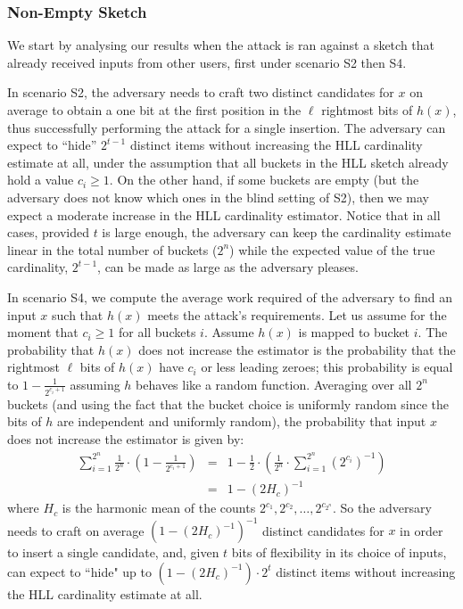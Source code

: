 \documentclass[11pt]{article}
\begin{document}
\subsubsection{Non-Empty Sketch}\label{sec:nonempty}

We start by analysing our results when the attack is ran against a sketch that already received inputs from other users, first under scenario S2 then S4. 

In scenario S2, the adversary needs to craft two distinct candidates for $x$ on average to obtain a one bit at the first position in the $\ell$ rightmost bits of $h(x)$, thus successfully performing the attack for a single insertion. The adversary can expect to ``hide''  $2^{t-1}$ distinct items without increasing the HLL cardinality estimate at all, under the assumption that all buckets in the HLL sketch already hold a value $c_i \ge 1$. On the other hand, if some buckets are empty (but the adversary does not know which ones in the blind setting of S2), then we may expect a moderate increase in the HLL cardinality estimator. Notice that in all cases, provided $t$ is large enough, the adversary can keep the cardinality estimate linear in the total number of buckets ($2^n$) while the expected value of the true cardinality, $2^{t-1}$, can be made as large as the adversary pleases.

In scenario S4, we compute the average work required of the adversary to find an input $x$ such that $h(x)$ meets the attack's requirements. Let us assume for the moment that $c_i \ge 1$ for all buckets $i$. Assume $h(x)$ is mapped to bucket $i$. The probability that $h(x)$ does not increase the estimator is the probability that the  rightmost $\ell$ bits of $h(x)$ have $c_i$ or less leading zeroes; this probability is equal to $1-\frac{1}{2^{c_i+1}}$ assuming $h$ behaves like a random function. Averaging over all $2^n$ buckets (and using the fact that the bucket choice is uniformly random since the bits of $h$ are independent and uniformly random), the probability that input $x$ does not increase the estimator is given by:
\begin{eqnarray*}
\sum_{i=1}^{2^n}\frac{1}{2^n} \cdot (1-\frac{1}{2^{c_i+1}}) & = & 1-\frac{1}{2}\cdot (\frac{1}{2^n}\cdot \sum_{i=1}^{2^n} {(2^{c_i})}^{-1}) \\
& = &1-(2H_c)^{-1} 
\end{eqnarray*}
where $H_c$ is the harmonic mean of the counts $2^{c_1}, 2^{c_2}, \ldots, 2^{c_{2^n}}$.
So the adversary needs to craft on average $(1-(2H_c)^{-1})^{-1}$ distinct candidates for $x$ in order to insert a single candidate, and, given $t$ bits of flexibility in its choice of inputs, can expect to ``hide" up to $(1-(2H_c)^{-1}) \cdot 2^t$ distinct items without increasing the HLL cardinality estimate at all.
\end{document}
